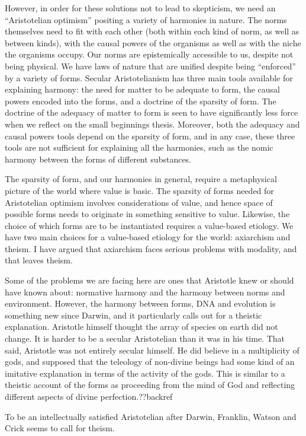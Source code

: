 However, in order for 
these solutions not to lead to skepticism, we need an ``Aristotelian optimism'' positing a variety of harmonies in nature. 
The norms themselves need to fit with each other (both within each 
kind of norm, as well as between kinds), with the causal powers of the organisms as well as with the niche the organisms 
occupy. Our norms are epistemically accessible to us, despite not being physical. We have laws of nature that are unified
despite being ``enforced'' by a variety of forms. Secular Aristotelianism has three main tools available for explaining harmony: the need for matter to be adequate to form, the causal powers encoded into the forms, and a doctrine of the sparsity of form. The doctrine of the adequacy of matter to form is seen to have significantly less force when we reflect on the small beginnings thesis. Moreover, both the adequacy and causal powers tools depend on the sparsity of form, and in any case, these three tools are not sufficient for explaining all the harmonies, such as the nomic harmony between the forms of different substances.

The sparsity of form, and our harmonies in general, require a metaphysical picture of the world where value is basic. The sparsity of forms needed for Aristotelian optimism involves considerations of value, and hence space of possible forms needs to originate in something sensitive to value. Likewise, the choice of which forms are to be instantiated requires a value-based etiology. We have two main choices for a value-based etiology for the world: axiarchism and theism. I have argued that axiarchism faces serious problems with modality, and that leaves theism.

Some of the problems we are facing here are ones that Aristotle knew or should have known about: normative harmony and the harmony between norms and environment. However, the harmony between forms, DNA and evolution is something new since Darwin, and it particularly calls out for a theistic explanation. Aristotle himself thought the array of species on earth did not change. It is harder to be a secular Aristotelian than it was in his time. That said, Aristotle was not entirely secular himself. He did believe in a multiplicity of gods, and supposed that the teleology of non-divine beings had some kind of an imitative explanation in terms of the activity of the gods. This is similar to a theistic account of the forms as proceeding from the mind of God and reflecting different aspects of divine perfection.??backref

To be an intellectually satisfied Aristotelian after Darwin, Franklin, Watson and Crick seems to call for theism.

\chaptertail


